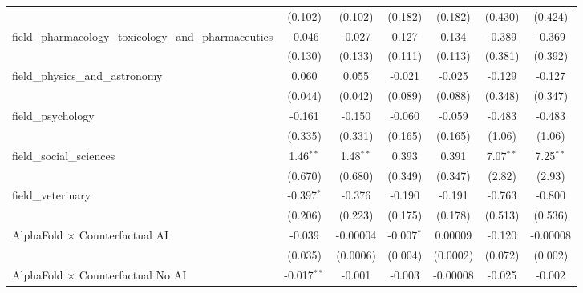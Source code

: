 \begin{tabular}{lcccccc}
                                                               & (0.102)        & (0.102)       & (0.182)       & (0.182)       & (0.430)       & (0.424)\\   
   field\_pharmacology\_toxicology\_and\_pharmaceutics         & -0.046         & -0.027        & 0.127         & 0.134         & -0.389        & -0.369\\   
                                                               & (0.130)        & (0.133)       & (0.111)       & (0.113)       & (0.381)       & (0.392)\\   
   field\_physics\_and\_astronomy                              & 0.060          & 0.055         & -0.021        & -0.025        & -0.129        & -0.127\\   
                                                               & (0.044)        & (0.042)       & (0.089)       & (0.088)       & (0.348)       & (0.347)\\   
   field\_psychology                                           & -0.161         & -0.150        & -0.060        & -0.059        & -0.483        & -0.483\\   
                                                               & (0.335)        & (0.331)       & (0.165)       & (0.165)       & (1.06)        & (1.06)\\   
   field\_social\_sciences                                     & 1.46$^{**}$    & 1.48$^{**}$   & 0.393         & 0.391         & 7.07$^{**}$   & 7.25$^{**}$\\   
                                                               & (0.670)        & (0.680)       & (0.349)       & (0.347)       & (2.82)        & (2.93)\\   
   field\_veterinary                                           & -0.397$^{*}$   & -0.376        & -0.190        & -0.191        & -0.763        & -0.800\\   
                                                               & (0.206)        & (0.223)       & (0.175)       & (0.178)       & (0.513)       & (0.536)\\   
   AlphaFold $\times$ Counterfactual AI                        & -0.039         & -0.00004      & -0.007$^{*}$  & 0.00009       & -0.120        & -0.00008\\   
                                                               & (0.035)        & (0.0006)      & (0.004)       & (0.0002)      & (0.072)       & (0.002)\\   
   AlphaFold $\times$ Counterfactual No AI                     & -0.017$^{**}$  & -0.001        & -0.003        & -0.00008      & -0.025        & -0.002\\   

\end{tabular}
